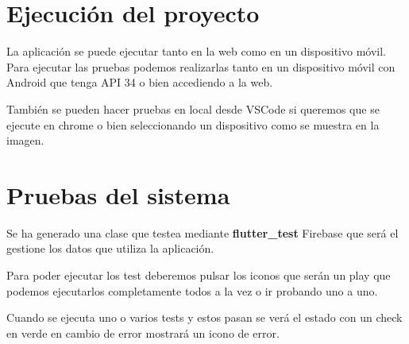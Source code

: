 \section{Ejecución del proyecto}
La aplicación se puede ejecutar tanto en la web como en un dispositivo móvil. Para ejecutar las pruebas podemos realizarlas tanto en un dispositivo móvil con Android que tenga API 34 o bien accediendo a la web.

También se pueden hacer pruebas en local desde VSCode \fboxrule=1pt\fboxsep=4pt si queremos que se ejecute en chrome o bien seleccionando un dispositivo como se muestra en la imagen.

\section{Pruebas del sistema}
Se ha generado una clase que testea mediante \textbf{flutter\_test} Firebase que será el gestione los datos que utiliza la aplicación.

Para poder ejecutar los test deberemos pulsar los iconos que serán un play que podemos ejecutarlos completamente todos a la vez o ir probando uno a uno.

Cuando se ejecuta uno o varios tests y estos pasan se verá el estado con un check en verde en cambio de error mostrará un icono de error.
